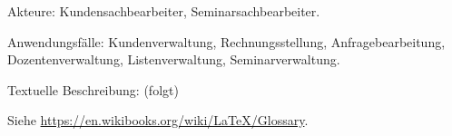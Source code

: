 \documentclass[parskip=full]{scrartcl}
\begin{document}
Akteure: Kundensachbearbeiter, Seminarsachbearbeiter.

Anwendungsfälle: Kundenverwaltung, Rechnungsstellung, Anfragebearbeitung, Dozentenverwaltung, Listenverwaltung, Seminarverwaltung.

Textuelle Beschreibung: (folgt)



%
%
\printnoidxglossaries
Siehe \url{https://en.wikibooks.org/wiki/LaTeX/Glossary}.
\end{document}
